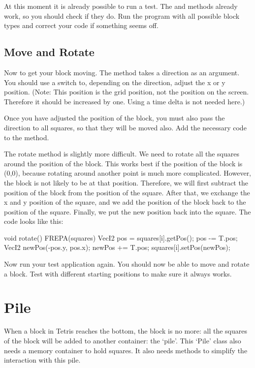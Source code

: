 At this moment it is already possible to run a test. The  and  methods already work, so you should check if they do. Run the program with all possible block types and correct your code if something seems off.

\subsection{Move and Rotate}
Now to get your block moving. The  method takes a direction as an argument. You should use a switch to, depending on the direction, adjust the x or y position. (Note: This position is the grid position, not the position on the screen. Therefore it should be increased by one. Using a time delta is not needed here.)

Once you have adjusted the position of the block, you must also pass the direction to all squares, so that they will be moved also. Add the necessary code to the  method.

The rotate method is slightly more difficult. We need to rotate all the squares around the position of the block. This works best if the position of the block is (0,0), because rotating around another point is much more complicated. However, the block is not likely to be at that position. Therefore, we will first subtract the position of the block from the position of the square. After that, we exchange the x and y position of the square, and we add the position of the block back to the position of the square. Finally, we put the new position back into the square. The code looks like this:

\begin{code}
void rotate()
{
 	 FREPA(squares)
  {
 		  VecI2 pos = squares[i].getPos();
 		  pos -= T.pos;
 		  VecI2 newPos(-pos.y, pos.x);
 		  newPos += T.pos;
 		  squares[i].setPos(newPos);
  }
}
\end{code}

Now run your test application again. You should now be able to move and rotate a block. Test with different starting positions to make sure it always works.


\section{Pile}
When a block in Tetris reaches the bottom, the block is no more: all the squares of the block will be added to another container: the `pile'. This `Pile' class also needs a memory container to hold squares. It also needs methods to simplify the interaction with this pile.

